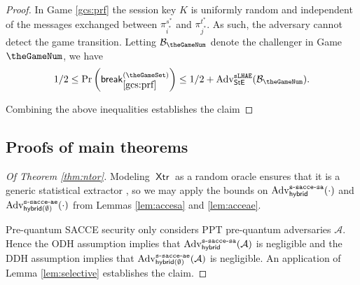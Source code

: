 \documentclass[USenglish,oneside,twocolumn]{article}
\theoremstyle{dgthm}
\theoremstyle{dgdef}
\newcounter{GameSet}
\newcounter{GameNum}[GameSet]
\newcommand{\Protocol}[1]{\operatorname{\mathsf{#1}}}
\newcommand{\AlgorithmName}[1]{\operatorname{\mathsf{#1}}}
\newcommand{\XTR}{\AlgorithmName{Xtr}}
\newcommand{\p}[2]{\pi_{#1}^{#2}}
\newcommand{\Oracle}[1]{\mathcal #1}
\newcommand{\Game}{\refstepcounter{GameNum}\paragraph*{Game \theGameNum.~}}
\newcommand{\brk}[1]{\mathsf{break}_{#1}^{(\theGameSet)}}
\newcommand{\Prb}[1]{\mathrm{Pr}\left(\brk{#1}\right)}
\newcommand{\Experiment}[1]{\operatorname{\tt{#1}}}
\newcommand{\Algorithm}[1]{\mathcal #1}
\newcommand{\AdvName}[2]{\operatorname{\mathrm{Adv}_{\Protocol{#1}}^{\Experiment{#2}}}}
\newcommand{\Adv}[3]{\AdvName{#1}{#2}(\Algorithm{#3})}
\newcommand{\SAcceSaNtor}[1]{\Adv{hybrid}{s-sacce-sa}{#1}}
\newcommand{\SAcceSaHybrid}[1]{\Adv{hybrid}{s-sacce-sa}{#1}}
\newcommand{\SAcceAeNtor}[1]{\Adv{hybrid(\emptyset)}{s-sacce-ae}{#1}}
\newcommand{\AdvSlhae}[1]{\Adv{StE}{sLHAE}{#1}}
\begin{document}
\begin{proof}
    In Game \ref{gcs:prf} the session key $K$ is uniformly random and
    independent of the messages exchanged between $\p{i^*}{s^*}$ and
    $\p{j^*}{t^*}$. As such, the adversary cannot detect the game transition.
    Letting $\Algorithm{B_\theGameNum}$ denote the challenger in Game $\theGameNum$,
    we have
    \begin{equation}\label{eq:gcs:slhae}
      1/2 \le \Prb{\ref{gcs:prf}} \le 1/2 + \AdvSlhae{B_\theGameNum}.
    \end{equation}

    Combining the above inequalities establishes the claim
  \end{proof}



  \vspace{-1.5em}
\subsection{Proofs of main theorems}
  \begin{proof}[Of Theorem \ref{thm:ntor}]
    Modeling $\XTR$ as a random oracle ensures that it is a generic statistical
    extractor \cite{Dodis2004,Krawczyk2010}, so we may apply the bounds on
    $\SAcceSaHybrid{\cdot}$ and $\SAcceAeNtor{\cdot}$ from Lemmas
    \ref{lem:accesa} and \ref{lem:acceae}.

    Pre-quantum SACCE security only considers PPT pre-quantum adversaries
    $\Oracle{A}$. Hence the ODH assumption implies that $\SAcceSaNtor{A}$ is
    negligible and the DDH assumption implies that $\SAcceAeNtor{A}$ is
    negligible. An application of Lemma \ref{lem:selective} establishes the
    claim.
  \end{proof}
\end{document}
